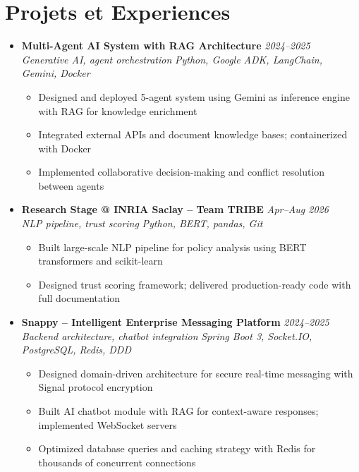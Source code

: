 \documentclass[a4paper,11pt]{article}
\begin{document}
\section{Projets et Experiences}
\begin{itemize}[leftmargin=*, label={-}]

\item \textbf{Multi-Agent AI System with RAG Architecture} \hfill \textit{2024--2025} \\
\textit{Generative AI, agent orchestration} \hfill \textit{Python, Google ADK, LangChain, Gemini, Docker}
\vspace{-2pt}
    \begin{itemize}[leftmargin=0.4cm, nosep, label=\tiny$\bullet$]
        \item \small{Designed and deployed 5-agent system using Gemini as inference engine with RAG for knowledge enrichment}
        \item \small{Integrated external APIs and document knowledge bases; containerized with Docker}
        \item \small{Implemented collaborative decision-making and conflict resolution between agents}
    \end{itemize}
\vspace{3pt}

\item \textbf{Research Stage @ INRIA Saclay -- Team TRIBE} \hfill \textit{Apr--Aug 2026} \\
\textit{NLP pipeline, trust scoring} \hfill \textit{Python, BERT, pandas, Git}
\vspace{-2pt}
    \begin{itemize}[leftmargin=0.4cm, nosep, label=\tiny$\bullet$]
        \item \small{Built large-scale NLP pipeline for policy analysis using BERT transformers and scikit-learn}
        \item \small{Designed trust scoring framework; delivered production-ready code with full documentation}
    \end{itemize}
\vspace{3pt}

\item \textbf{Snappy -- Intelligent Enterprise Messaging Platform} \hfill \textit{2024--2025} \\
\textit{Backend architecture, chatbot integration} \hfill \textit{Spring Boot 3, Socket.IO, PostgreSQL, Redis, DDD}
\vspace{-2pt}
    \begin{itemize}[leftmargin=0.4cm, nosep, label=\tiny$\bullet$]
        \item \small{Designed domain-driven architecture for secure real-time messaging with Signal protocol encryption}
        \item \small{Built AI chatbot module with RAG for context-aware responses; implemented WebSocket servers}
        \item \small{Optimized database queries and caching strategy with Redis for thousands of concurrent connections}
    \end{itemize}
\vspace{3pt}


\end{itemize}
\end{document}
